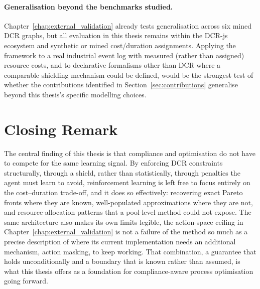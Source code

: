 \paragraph{Generalisation beyond the benchmarks studied.} Chapter~\ref{chap:external_validation} already tests generalisation across six mined \ac{DCR} graphs, but all evaluation in this thesis remains within the DCR-js ecosystem and synthetic or mined cost/duration assignments. Applying the framework to a real industrial event log with measured (rather than assigned) resource costs, and to declarative formalisms other than \ac{DCR} where a comparable shielding mechanism could be defined, would be the strongest test of whether the contributions identified in Section~\ref{sec:contributions} generalise beyond this thesis's specific modelling choices.

\section{Closing Remark}
\label{sec:closing_remark}

The central finding of this thesis is that compliance and optimisation do not have to compete for the same learning signal. By enforcing \ac{DCR} constraints structurally, through a shield, rather than statistically, through penalties the agent must learn to avoid, reinforcement learning is left free to focus entirely on the cost--duration trade-off, and it does so effectively: recovering exact Pareto fronts where they are known, well-populated approximations where they are not, and resource-allocation patterns that a pool-level method could not expose. The same architecture also makes its own limits legible, the action-space ceiling in Chapter~\ref{chap:external_validation} is not a failure of the method so much as a precise description of where its current implementation needs an additional mechanism, action masking, to keep working. That combination, a guarantee that holds unconditionally and a boundary that is known rather than assumed, is what this thesis offers as a foundation for compliance-aware process optimisation going forward.
